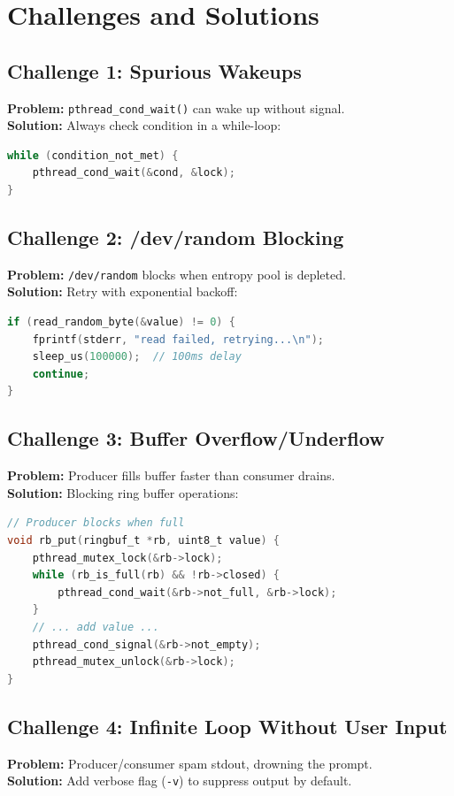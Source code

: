 \documentclass[12pt,a4paper]{article}
\begin{document}
\clearpage

\section{Challenges and Solutions}

\subsection{Challenge 1: Spurious Wakeups}
\textbf{Problem:} \texttt{pthread\_cond\_wait()} can wake up without signal. \\
\textbf{Solution:} Always check condition in a while-loop:
\begin{lstlisting}[language=C]
while (condition_not_met) {
    pthread_cond_wait(&cond, &lock);
}
\end{lstlisting}

\subsection{Challenge 2: /dev/random Blocking}
\textbf{Problem:} \texttt{/dev/random} blocks when entropy pool is depleted. \\
\textbf{Solution:} Retry with exponential backoff:
\begin{lstlisting}[language=C]
if (read_random_byte(&value) != 0) {
    fprintf(stderr, "read failed, retrying...\n");
    sleep_us(100000);  // 100ms delay
    continue;
}
\end{lstlisting}

\subsection{Challenge 3: Buffer Overflow/Underflow}
\textbf{Problem:} Producer fills buffer faster than consumer drains. \\
\textbf{Solution:} Blocking ring buffer operations:
\begin{lstlisting}[language=C]
// Producer blocks when full
void rb_put(ringbuf_t *rb, uint8_t value) {
    pthread_mutex_lock(&rb->lock);
    while (rb_is_full(rb) && !rb->closed) {
        pthread_cond_wait(&rb->not_full, &rb->lock);
    }
    // ... add value ...
    pthread_cond_signal(&rb->not_empty);
    pthread_mutex_unlock(&rb->lock);
}
\end{lstlisting}

\subsection{Challenge 4: Infinite Loop Without User Input}
\textbf{Problem:} Producer/consumer spam stdout, drowning the prompt. \\
\textbf{Solution:} Add verbose flag (\texttt{-v}) to suppress output by default.
\end{document}
